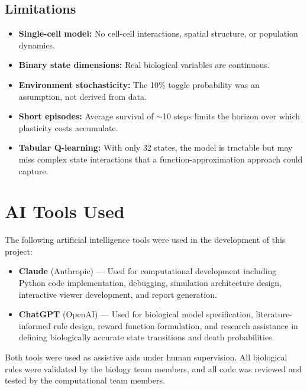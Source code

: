 \documentclass[12pt,a4paper]{article}
\begin{document}
\subsection{Limitations}

\begin{itemize}[nosep]
    \item \textbf{Single-cell model:} No cell-cell interactions, spatial structure, or population dynamics.
    \item \textbf{Binary state dimensions:} Real biological variables are continuous.
    \item \textbf{Environment stochasticity:} The 10\% toggle probability was an assumption, not derived from data.
    \item \textbf{Short episodes:} Average survival of $\sim$10 steps limits the horizon over which plasticity costs accumulate.
    \item \textbf{Tabular Q-learning:} With only 32 states, the model is tractable but may miss complex state interactions that a function-approximation approach could capture.
\end{itemize}

\section{AI Tools Used}

The following artificial intelligence tools were used in the development of this project:

\begin{itemize}
    \item \textbf{Claude} (Anthropic) --- Used for computational development including Python code implementation, debugging, simulation architecture design, interactive viewer development, and report generation.
    \item \textbf{ChatGPT} (OpenAI) --- Used for biological model specification, literature-informed rule design, reward function formulation, and research assistance in defining biologically accurate state transitions and death probabilities.
\end{itemize}

Both tools were used as assistive aids under human supervision. All biological rules were validated by the biology team members, and all code was reviewed and tested by the computational team members.
\end{document}
